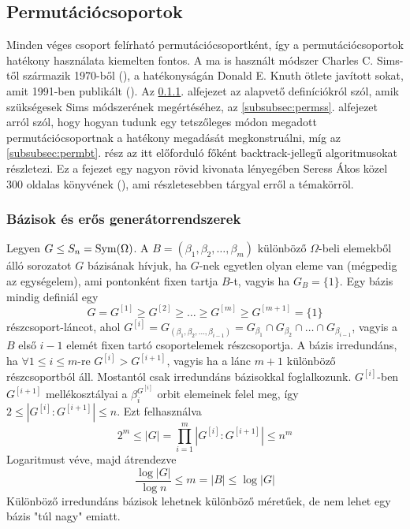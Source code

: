 \subsection{Permutációcsoportok}
\label{subsec:permutacio}
Minden véges csoport felírható permutációcsoportként, így a permutációcsoportok hatékony használata kiemelten fontos.
A ma is használt módszer Charles C. Sims-től származik 1970-ből (\cite{Sim70}), a hatékonyságán Donald E. Knuth ötlete javított sokat, amit 1991-ben publikált (\cite{Knu91}).
Az \ref{subsubsec:permdef}. alfejezet az alapvető definíciókról szól, amik szükségesek Sims módszerének megértéséhez,
az \ref{subsubsec:permss}. alfejezet arról szól, hogy hogyan tudunk egy tetszőleges módon megadott permutációcsoportnak a hatékony megadását megkonstruálni,
míg az \ref{subsubsec:permbt}. rész az itt előforduló főként backtrack-jellegű algoritmusokat részletezi.
Ez a fejezet egy nagyon rövid kivonata lényegében Seress Ákos közel 300 oldalas könyvének (\cite{Ser03}), ami részletesebben tárgyal erről a témakörröl.

\subsubsection{Bázisok és erős generátorrendszerek}
\label{subsubsec:permdef}
Legyen $G \le S_n = \operatorname{Sym}(\Omega)$.
A $B=(\beta_1,\beta_2,\dots,\beta_m)$ különböző $\Omega$-beli elemekből álló sorozatot $G$ bázisának hívjuk,
ha $G$-nek egyetlen olyan eleme van (mégpedig az egységelem), ami pontonként fixen tartja $B$-t, vagyis ha $G_B=\{1\}$.
Egy bázis mindig definiál egy
\begin{equation}
\label{eq:permlanc}
G = G^{[1]} \ge G^{[2]} \ge \dots \ge G^{[m]} \ge G^{[m+1]} = \{1\}
\end{equation}
részcsoport-láncot, ahol $G^{[i]}=G_{(\beta_1,\beta_2,\dots,\beta_{i-1})}=G_{\beta_1}\cap G_{\beta_2}\cap\dots\cap G_{\beta_{i-1}}$, vagyis a $B$ első $i-1$ elemét fixen tartó csoportelemek részcsoportja.
A bázis irredundáns, ha $\forall 1\le i \le m$-re $G^{[i]} > G^{[i+1]}$, vagyis ha a lánc $m+1$ különböző részcsoportból áll.
Mostantól csak irredundáns bázisokkal foglalkozunk.
$G^{[i]}$-ben $G^{[i+1]}$ mellékosztályai a $\beta_i^{G^{[i]}}$ orbit elemeinek felel meg, így $2 \le \left| G^{[i]} : G^{[i+1]} \right| \le n$.
Ezt felhasználva
\begin{equation}
\label{eq:permmeret}
2^m \le |G|=\prod_{i=1}^m \left| G^{[i]} : G^{[i+1]} \right| \le n^m
\end{equation}
Logaritmust véve, majd átrendezve
\begin{equation}
\label{eq:permmeret2}
\frac{\log |G|}{\log n} \le m = |B| \le \log |G|
\end{equation}
Különböző irredundáns bázisok lehetnek különböző méretűek, de nem lehet egy bázis "túl nagy" emiatt.

